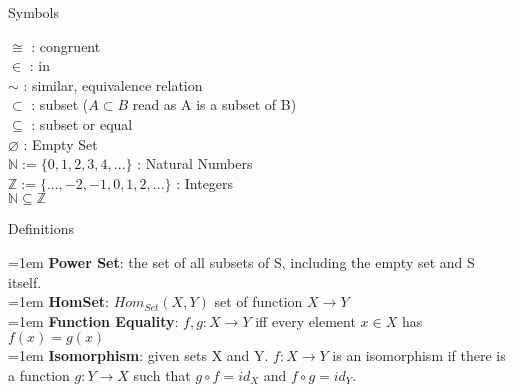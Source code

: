 \documentclass[11pt, oneside]{article}   	%
\begin{document}
{\centering Symbols
 
}

$\cong$ : congruent \\
$\in$ : in \\
$\sim$ : similar, equivalence relation \\
$\subset$ : subset ($A \subset B$ read as A is a subset of B)\\
$\subseteq$ : subset or equal \\
$\varnothing$ : Empty Set \\
$\mathbb{N} := \{0,1,2,3,4,...\}$ : Natural Numbers \\
$\mathbb{Z} := \{...,-2,-1,0,1,2,...\}$ : Integers  \\ 
$\mathbb{N}  \subseteq \mathbb{Z}$



{\centering Definitions
 
}

\hangindent=1em
\textbf{Power Set}: the set of all subsets of S, including the empty set and S itself.\\

\hangindent=1em
\textbf{HomSet}: $Hom_{Set}(X,Y)$  set of function $X \rightarrow Y $\\

\hangindent=1em
\textbf{Function Equality}: $f,g: X \rightarrow Y$ iff every element $x \in X$ has $f(x) = g(x)$ \\

\hangindent=1em
\textbf{Isomorphism}: given sets X and Y. $f: X \rightarrow Y$ is an isomorphism if there is a function $g: Y \rightarrow X$ such that $g \circ f = id_{X}$ and $f \circ g = id_{Y}$. \\
\end{document}
